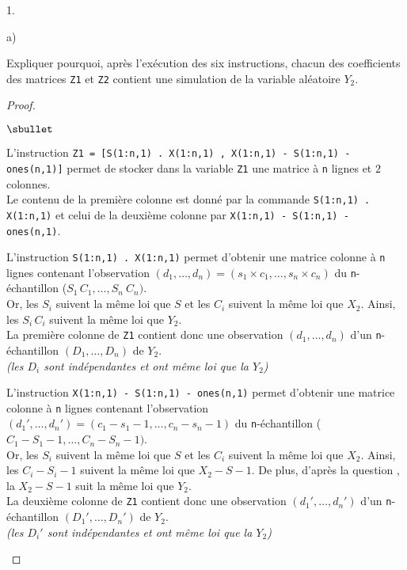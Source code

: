 \documentclass[11pt]{article}%
\begin{document}
\begin{noliste}{1.}
\begin{noliste}{a)}
    
  \item Expliquer pourquoi, après l'exécution des six instructions,
    chacun des coefficients des matrices {\tt Z1} et {\tt Z2} contient
    une simulation de la variable aléatoire $Y_2$.
    \begin{proof}~
      \begin{noliste}{$\sbullet$}
      \item L'instruction {\tt  Z1 = [S(1:n,1) .\Sfois{} X(1:n,1) ,
          X(1:n,1) - S(1:n,1) - ones(n,1)]} permet de stocker dans la
        variable {\tt Z1} une matrice à {\tt n} lignes et $2$
        colonnes.\\
        Le contenu de la première colonne est donné par la commande
        {\tt S(1:n,1) .\Sfois{} X(1:n,1)} et celui de la deuxième
        colonne par {\tt  X(1:n,1) - S(1:n,1) - ones(n,1)}.

      \item L'instruction {\tt S(1:n,1) .\Sfois{} X(1:n,1)}
        permet d'obtenir une matrice colonne à {\tt n} lignes
        contenant l'observation $(d_1, \ldots, d_n) =
        (s_1 \times c_1, \ldots , s_n \times c_n)$
        du {\tt n}-échantillon ($S_1 \, C_1, \ldots, S_n \ C_n)$.\\
        Or, les $S_i$ suivent la même loi que $S$ et les $C_i$ suivent
        la même loi que $X_2$. Ainsi, les $S_i \, C_i$ suivent la même
        loi que $Y_2$.\\
        La première colonne de {\tt Z1} contient donc une observation $(d_1,
        \ldots, d_n)$ d'un {\tt n}-échantillon $(D_1, \ldots, D_n)$ de
        $Y_2$.\\
        {\it (les \var $D_i$ sont indépendantes et ont même
          loi que la \var $Y_2$)}




        
      \item L'instruction {\tt X(1:n,1) - S(1:n,1) - ones(n,1)}
        permet d'obtenir une matrice colonne à {\tt n} lignes
        contenant l'observation $(d_1', \ldots, d_n') =
        (c_1 - s_1 - 1, \ldots , c_n - s_n -1)$
        du {\tt n}-échantillon ($C_1 - S_1-1, \ldots, C_n- S_n -1)$.\\
        Or, les $S_i$ suivent la même loi que $S$ et les $C_i$ suivent
        la même loi que $X_2$. Ainsi, les $C_i-S_i-1$ suivent la même
        loi que $X_2 - S-1$. De plus, d'après la question ,
        la \var $X_2-S-1$ suit la même loi que $Y_2$.\\ 
        La deuxième colonne de {\tt Z1} contient donc une observation $(d_1',
        \ldots, d_n')$ d'un {\tt n}-échantillon $(D_1', \ldots, D_n')$ de
        $Y_2$.\\
        {\it (les \var $D_i'$ sont indépendantes et ont même
          loi que la \var $Y_2$)}
        

\end{noliste}
\end{proof}
\end{noliste}
\end{noliste}
\end{document}
